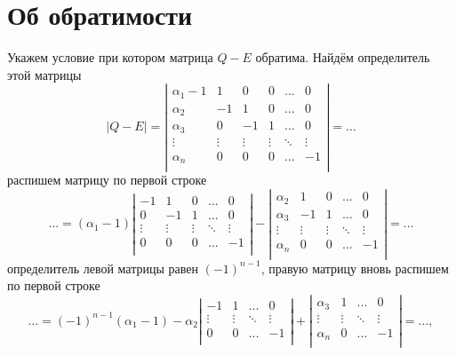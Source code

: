 \documentclass[draft]{article}
\begin{document}
\section{Об обратимости}

Укажем условие при котором матрица $Q - E$ обратима. Найдём определитель этой матрицы
\begin{displaymath}
  |Q - E| = \left|
  \begin{array}{cccccc}
    \alpha_1-1 & 1      & 0      & 0      & \ldots & 0      \\
    \alpha_2   & -1     & 1      & 0      & \ldots & 0      \\
    \alpha_3   & 0      & -1     & 1      & \ldots & 0      \\
    \vdots     & \vdots & \vdots & \vdots & \ddots & \vdots \\
    \alpha_n   & 0      & 0      & 0      & \ldots & -1     \\
  \end{array}
  \right| = \ldots
\end{displaymath}
распишем матрицу по первой строке
\begin{displaymath}
  \ldots = (\alpha_1 - 1) \left|
  \begin{array}{ccccc}
    -1     & 1      & 0      & \ldots & 0      \\
    0      & -1     & 1      & \ldots & 0      \\
    \vdots & \vdots & \vdots & \ddots & \vdots \\
    0      & 0      & 0      & \ldots & -1     \\
  \end{array}
  \right|
  -
  \left|
  \begin{array}{ccccc}
    \alpha_2   & 1      & 0      & \ldots & 0      \\
    \alpha_3   & -1     & 1      & \ldots & 0      \\
    \vdots     & \vdots & \vdots & \ddots & \vdots \\
    \alpha_n   & 0      & 0      & \ldots & -1     \\
  \end{array}
  \right| = \ldots
\end{displaymath}
определитель левой матрицы равен $(-1)^{n-1}$, правую матрицу вновь распишем по первой строке
\begin{displaymath}
  \ldots = (-1)^{n-1}(\alpha_1 - 1) 
  -
  \alpha_2\left|
  \begin{array}{cccc}
    -1     & 1      & \ldots & 0      \\
    \vdots & \vdots & \ddots & \vdots \\
    0      & 0      & \ldots & -1     \\
  \end{array}
  \right|
  +
  \left|
  \begin{array}{cccc}
    \alpha_3   & 1      & \ldots & 0      \\
    \vdots     & \vdots & \ddots & \vdots \\
    \alpha_n   & 0      & \ldots & -1     \\
  \end{array}
  \right| = \ldots,
\end{displaymath}
\end{document}
